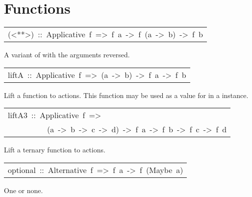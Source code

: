 \section{Functions
}
\begin{haddockdesc}
\item[\begin{tabular}{@{}l}
(<**>)\ ::\ Applicative\ f\ =>\ f\ a\ ->\ f\ (a\ ->\ b)\ ->\ f\ b
\end{tabular}]\haddockbegindoc
A variant of \haddockid{<*>} with the arguments reversed.\par

\end{haddockdesc}
\begin{haddockdesc}
\item[\begin{tabular}{@{}l}
liftA\ ::\ Applicative\ f\ =>\ (a\ ->\ b)\ ->\ f\ a\ ->\ f\ b
\end{tabular}]\haddockbegindoc
Lift a function to actions.
 This function may be used as a value for  in a  instance.\par

\end{haddockdesc}
\begin{haddockdesc}
\item[\begin{tabular}{@{}l}
liftA3\ ::\ Applicative\ f\ =>\\\ \ \ \ \ \ \ \ \ \ (a\ ->\ b\ ->\ c\ ->\ d)\ ->\ f\ a\ ->\ f\ b\ ->\ f\ c\ ->\ f\ d
\end{tabular}]\haddockbegindoc
Lift a ternary function to actions.\par

\end{haddockdesc}
\begin{haddockdesc}
\item[\begin{tabular}{@{}l}
optional\ ::\ Alternative\ f\ =>\ f\ a\ ->\ f\ (Maybe\ a)
\end{tabular}]\haddockbegindoc
One or none.\par

\end{haddockdesc}
